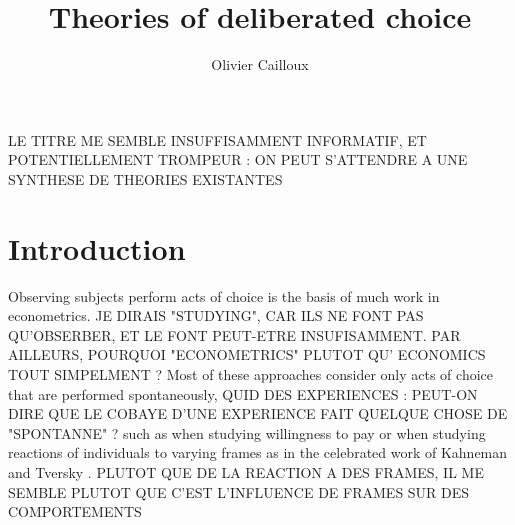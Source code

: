 \documentclass[version=last, pagesize, twoside=off, bibliography=totoc, DIV=calc, fontsize=12pt, a4paper, french, english]{scrartcl}
\begin{document}
\title{Theories of deliberated choice} LE TITRE ME SEMBLE INSUFFISAMMENT INFORMATIF,  ET POTENTIELLEMENT TROMPEUR : ON PEUT S'ATTENDRE A UNE SYNTHESE DE THEORIES EXISTANTES
\author{Olivier Cailloux}
\makeatletter
{}
\makeatother
\maketitle

\section{Introduction}
Observing subjects perform acts of choice is the basis of much work in econometrics. JE DIRAIS "STUDYING", CAR ILS NE FONT PAS QU'OBSERBER, ET LE FONT PEUT-ETRE INSUFISAMMENT. PAR AILLEURS, POURQUOI "ECONOMETRICS" PLUTOT QU' ECONOMICS TOUT SIMPELMENT ?
Most of these approaches consider only acts of choice that are performed spontaneously, QUID DES EXPERIENCES : PEUT-ON DIRE QUE LE COBAYE D'UNE EXPERIENCE FAIT QUELQUE CHOSE DE "SPONTANNE" ? such as when studying willingness to pay or when studying reactions of individuals to varying frames as in the celebrated work of Kahneman and Tversky \citep{bell_descriptive_1988, kahneman_thinking_2012}. PLUTOT QUE DE LA REACTION A DES FRAMES, IL ME SEMBLE PLUTOT QUE C'EST L'INFLUENCE DE FRAMES SUR DES COMPORTEMENTS
\end{document}
